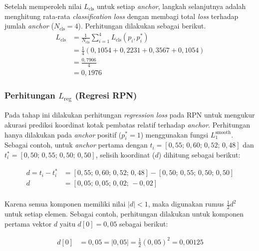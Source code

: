 Setelah memperoleh nilai $L_{\text{cls}}$ untuk setiap \textit{anchor}, langkah selanjutnya adalah menghitung rata-rata \textit{classification loss} dengan membagi total \textit{loss} terhadap jumlah \textit{anchor} ($N_{\text{cls}} = 4$). Perhitungan dilakukan sebagai berikut. \\

\begin{align*}
    L_{\text{cls}} &= \frac{1}{N_{\text{cls}}} \sum_{i=1}^{4} L_{\text{cls}}(p_i, p_i^*) \\[0.5em]
     &= \frac{1}{4} (0{,}1054 + 0{,}2231 + 0{,}3567 + 0{,}1054) \\[0.5em]
     &= \frac{0{,}7906}{4} \\[0.5em]
     &= 0{,}1976
\end{align*}

\subsubsection{Perhitungan $L_{\text{reg}}$ (Regresi RPN)}
Pada tahap ini dilakukan perhitungan \textit{regression loss} pada RPN untuk mengukur akurasi prediksi koordinat kotak pembatas relatif terhadap \textit{anchor}. Perhitungan hanya dilakukan pada \textit{anchor} positif ($p_i^* = 1$) menggunakan fungsi $L_1^{\text{smooth}}$. Sebagai contoh, untuk \textit{anchor} pertama dengan $t_i = [0{,}55; \,0{,}60; \,0{,}52; \,0{,}48]$ dan $t_i^* = [0{,}50; \,0{,}55; \,0{,}50; \,0{,}50]$, selisih koordinat ($d$) dihitung sebagai berikut:

\begin{align*}
    d = t_i - t_i^* &= [0{,}55; \,0{,}60; \,0{,}52; \,0{,}48] - [0{,}50; \,0{,}55; \,0{,}50; \,0{,}50] \\[0.5em]
    d &= [0{,}05; \,0{,}05; \,0{,}02; \,-0{,}02] \\[0.5em]
\end{align*}

Karena semua komponen memiliki nilai $|d| < 1$, maka digunakan rumus $\frac{1}{2}d^2$ untuk setiap elemen. Sebagai contoh, perhitungan dilakukan untuk komponen pertama vektor $d$ yaitu $d[0] = 0{,}05$ sebagai berikut:

\begin{align*}
    d[0] &= 0{,}05 = |0{,}05| = \frac{1}{2}(0{,}05)^2 = 0{,}00125 \\[0.5em]
\end{align*}

